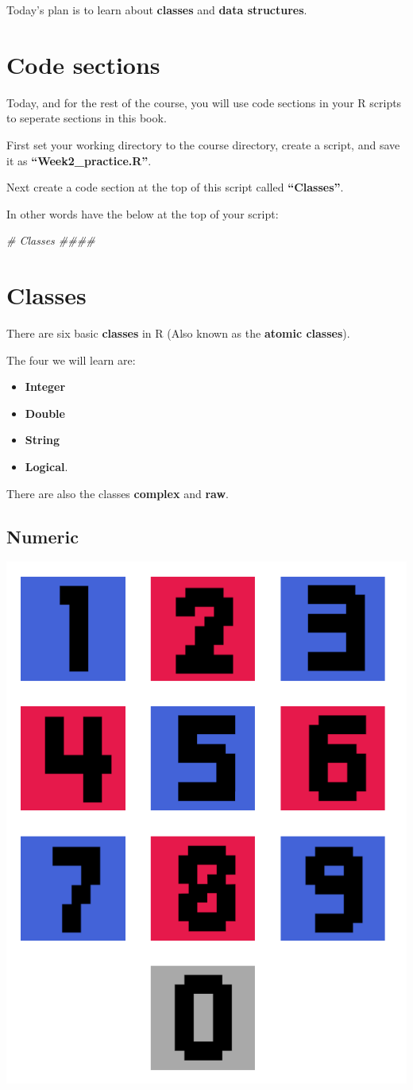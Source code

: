 \documentclass[]{book}
\newenvironment{Shaded}{\begin{snugshade}}{\end{snugshade}}
\newcommand{\CommentTok}[1]{\textcolor[rgb]{0.56,0.35,0.01}{\textit{#1}}}
\providecommand{\tightlist}{%
  \setlength{\itemsep}{0pt}\setlength{\parskip}{0pt}}
\begin{document}
Today's plan is to learn about \textbf{classes} and \textbf{data
structures}.

\section{Code sections}\label{code-sections}

Today, and for the rest of the course, you will use code sections in
your R scripts to seperate sections in this book.

First set your working directory to the course directory, create a
script, and save it as \textbf{``Week2\_practice.R''}.

Next create a code section at the top of this script called
\textbf{``Classes''}.

In other words have the below at the top of your script:

\begin{Shaded}
\begin{Highlighting}[]
\CommentTok{# Classes ####}
\end{Highlighting}
\end{Shaded}

\section{Classes}\label{classes}

There are six basic \textbf{classes} in R (Also known as the
\textbf{atomic classes}).

The four we will learn are:

\begin{itemize}
\tightlist
\item
  \textbf{Integer}
\item
  \textbf{Double}
\item
  \textbf{String}
\item
  \textbf{Logical}.
\end{itemize}

There are also the classes \textbf{complex} and \textbf{raw}.

\subsection{Numeric}\label{numeric}

\begin{center}\includegraphics[width=0.2\linewidth]{figures/numbers} \end{center}
\end{document}
